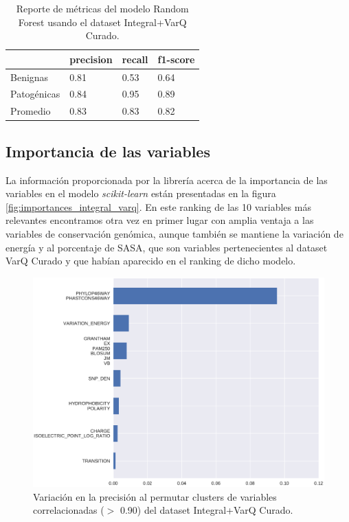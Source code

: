 \begin{table}[H]
\centering
\begin{tabular}{|l|l|l|l|}
\hline
             & precision & recall & f1-score \\ \hline
Benignas     & 0.81      & 0.53   & 0.64     \\ \hline
Patogénicas  & 0.84      & 0.95   & 0.89     \\ \hline
Promedio     & 0.83      & 0.83   & 0.82     \\ \hline
\end{tabular}
\caption{Reporte de métricas del modelo Random Forest usando el dataset Integral+VarQ Curado.}
\label{tab:metrics_integral_varq}
\end{table}

\subsection{Importancia de las variables}
La información proporcionada por la librería acerca de la importancia de las variables en el modelo \textit{scikit-learn} están presentadas en la figura \ref{fig:importances_integral_varq}. En este ranking de las 10 variables más relevantes encontramos otra vez en primer lugar con amplia ventaja a las variables de conservación genómica, aunque también se mantiene la variación de energía y al porcentaje de SASA, que son variables pertenecientes al dataset VarQ Curado y que habían aparecido en el ranking de dicho modelo. 

\begin{figure}[H]
    \centering
    \includegraphics[scale=0.6]{documents/latex/figures/3/integral_varq/integral_varq_importance_cluster.pdf}
    \caption{Variación en la precisión al permutar clusters de variables correlacionadas ($>$ 0.90) del dataset Integral+VarQ Curado.}
    \label{fig:importance_cluster_integral_varq}
\end{figure}


